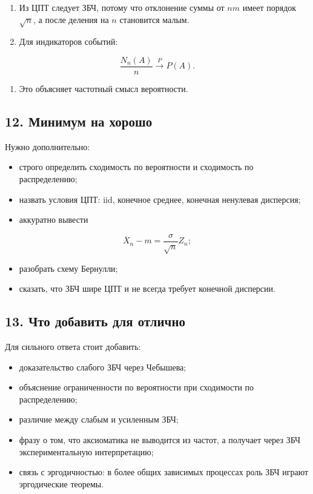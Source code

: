 \documentclass[
  11pt,
  a4paper,
]{article}
\providecommand{\tightlist}{%
  \setlength{\itemsep}{0pt}\setlength{\parskip}{0pt}}
\begin{document}
\begin{enumerate}
\def\labelenumi{\arabic{enumi}.}
\setcounter{enumi}{2}
\item
  Из ЦПТ следует ЗБЧ, потому что отклонение суммы от \(nm\) имеет
  порядок \(\sqrt n\), а после деления на \(n\) становится малым.
\item
  Для индикаторов событий:
\end{enumerate}

\[
\frac{N_n(A)}{n}\xrightarrow{P}P(A).
\]

\begin{enumerate}
\def\labelenumi{\arabic{enumi}.}
\setcounter{enumi}{4}
\tightlist
\item
  Это объясняет частотный смысл вероятности.
\end{enumerate}

\subsection{12. Минимум на
хорошо}\label{ux43cux438ux43dux438ux43cux443ux43c-ux43dux430-ux445ux43eux440ux43eux448ux43e}

Нужно дополнительно:

\begin{itemize}
\tightlist
\item
  строго определить сходимость по вероятности и сходимость по
  распределению;
\item
  назвать условия ЦПТ: iid, конечное среднее, конечная ненулевая
  дисперсия;
\item
  аккуратно вывести
\end{itemize}

\[
\overline X_n-m
=
\frac{\sigma}{\sqrt n}Z_n;
\]

\begin{itemize}
\tightlist
\item
  разобрать схему Бернулли;
\item
  сказать, что ЗБЧ шире ЦПТ и не всегда требует конечной дисперсии.
\end{itemize}

\subsection{13. Что добавить для
отлично}\label{ux447ux442ux43e-ux434ux43eux431ux430ux432ux438ux442ux44c-ux434ux43bux44f-ux43eux442ux43bux438ux447ux43dux43e}

Для сильного ответа стоит добавить:

\begin{itemize}
\tightlist
\item
  доказательство слабого ЗБЧ через Чебышева;
\item
  объяснение ограниченности по вероятности при сходимости по
  распределению;
\item
  различие между слабым и усиленным ЗБЧ;
\item
  фразу о том, что аксиоматика не выводится из частот, а получает через
  ЗБЧ экспериментальную интерпретацию;
\item
  связь с эргодичностью: в более общих зависимых процессах роль ЗБЧ
  играют эргодические теоремы.
\end{itemize}
\end{document}
